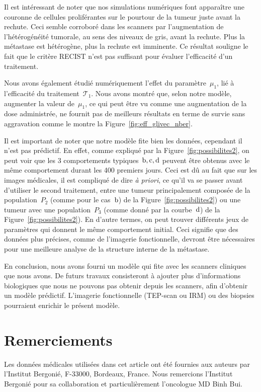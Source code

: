 \documentclass[11pt]{amsart}
\numberwithin{equation}{section}
\newcommand{\TI}{{\mathcal T_1}}
\newcommand{\muI}{\mu_1}
\begin{document}
Il est intéressant de noter que nos simulations numériques font apparaître une couronne de cellules proliférantes sur le pourtour de la tumeur juste avant la rechute. Ceci semble corroboré dans les scanners par l'augmentation de l'hétérogénéité tumorale, au sens des niveaux de gris, avant la rechute. Plus la métastase est hétérogène, plus la rechute est imminente. Ce résultat souligne le fait que le critère RECIST n'est pas suffisant pour évaluer l'efficacité d'un traitement.


Nous avons également étudié numériquement l'effet du paramètre~$\muI$, lié à l'efficacité du traitement~$\TI$. Nous avons montré que, selon notre modèle, augmenter la valeur de~$\muI$, ce qui peut être vu comme une augmentation de la dose administrée, ne fournit pas de meilleurs résultats en terme de survie sans aggravation comme le montre la Figure~\ref{fig:eff_glivec_nber}.


Il est important de noter que notre modèle fite bien les données, cependant il n'est pas prédictif. En effet, comme expliqué par la Figure~\ref{fig:possibilites2}, on peut voir que les 3 comportements typiques~$\rm{b,c,d}$ peuvent être obtenus avec le même comportement durant les 400 premiers jours. Ceci est dû au fait que sur les images médicales, il est compliqué de dire {\it à priori}, ce qu'il va se passer avant d'utiliser le second traitement, entre une tumeur principalement composée de la population~$P_2$ (comme pour le cas~${\rm b}$) de la Figure~\ref{fig:possibilites2}) ou une tumeur avec une population~$P_3$ (comme donné par la courbe~${\rm d}$) de la  Figure~\ref{fig:possibilites2}). En d'autre termes, on peut trouver différents jeux de paramètres qui donnent le même comportement initial. Ceci signifie que des données plus précises, comme de l'imagerie fonctionnelle, devront être nécessaires pour une meilleure analyse de la structure interne de la métastase. 


En conclusion, nous avons fourni un modèle qui fite avec les scanners cliniques que nous avons. De futurs travaux consisteront à ajouter plus d'informations biologiques que nous ne pouvons pas obtenir depuis les scanners, afin d'obtenir un modèle prédictif. L'imagerie fonctionnelle (TEP-scan ou IRM) ou des biopsies pourraient enrichir le présent modèle.


\section*{Remerciements}

Les données médicales utilisées dans cet article ont été fournies aux auteurs  par l'Institut Bergoni\'e, F-33000, Bordeaux, France. Nous remercions l'Institut Bergoni\'e pour sa collaboration et particulièrement l'oncologue MD Binh Bui.
\end{document}
